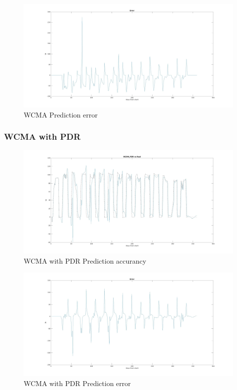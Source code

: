 \begin{figure}[h]
    \includegraphics[width=\textwidth]{WCMA_error.jpg}
    \caption{WCMA Prediction error}
    \label{fig:wcma_error}
\end{figure}


\subsubsection{WCMA with PDR} 
\label{ssub:wcma_with_pdr}
\begin{figure}[h]
    \includegraphics[width=\textwidth]{WCMA-PDR.jpg}
    \caption{WCMA with PDR Prediction accurancy}
    \label{fig:wcmapdr_comp}
\end{figure}

\begin{figure}[h]
    \includegraphics[width=\textwidth]{WCMA-PDR_error.jpg}
    \caption{WCMA with PDR Prediction error}
    \label{fig:wcmapdr_error}
\end{figure}


